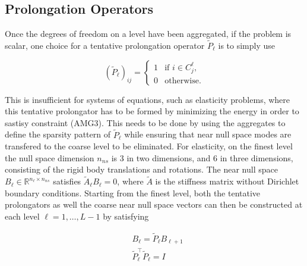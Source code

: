 \subsection{Prolongation Operators}

Once the degrees of freedom on a level have been aggregated, if the problem is scalar, one choice for a tentative prolongation operator $\tilde{P}_\ell$ is to simply use

\begin{equation}
	\left(\tilde P_\ell \right)_{ij} =
	\begin{cases}
		1 & \text{if $i \in C_j^\ell$}, \\
		0 & \text{otherwise}.
	\end{cases}
\end{equation}

This is insufficient for systems of equations, such as elasticity problems, where this tentative prolongator has to be formed by minimizing the energy in order to sastisy constraint (AMG3). This needs to be done by using the aggregates to define the sparsity pattern of $\tilde{P}_\ell$ while ensuring that near null space modes are transfered to the coarse level to be eliminated. For elasticity, on the finest level the null space dimension $n_{ns}$ is 3 in two dimensions, and 6 in three dimensions, consisting of the rigid body translations and rotations. The near null space $B_\ell \in \mathbb{R}^{n_\ell \times n_{ns}}$ satisfies $\tilde{A}_\ell B_\ell = 0$, where $\tilde{A}$ is the stiffness matrix without Dirichlet boundary conditions. Starting from the finest level, both the tentative prolongators as well the coarse near null space vectors can then be constructed at each level $\ell = 1, \ldots, L - 1$ by satisfying

\begin{equation}
	\label{eq:prolongator_req}
	\begin{aligned}
	& B_\ell = \tilde{P}_\ell B_{\ell+1} \\
	& \tilde{P}_\ell^\top \tilde{P}_\ell = I
	\end{aligned}
\end{equation}

